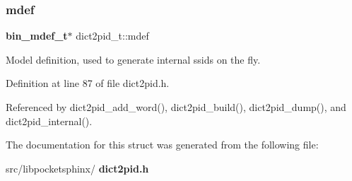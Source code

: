 \subsubsection{mdef}
{\footnotesize\ttfamily \textbf{ bin\+\_\+mdef\+\_\+t}$\ast$ dict2pid\+\_\+t\+::mdef}



Model definition, used to generate internal ssids on the fly. 



Definition at line 87 of file dict2pid.\+h.



Referenced by dict2pid\+\_\+add\+\_\+word(), dict2pid\+\_\+build(), dict2pid\+\_\+dump(), and dict2pid\+\_\+internal().



The documentation for this struct was generated from the following file\+:\begin{DoxyCompactItemize}
\item 
src/libpocketsphinx/\textbf{ dict2pid.\+h}\end{DoxyCompactItemize}
